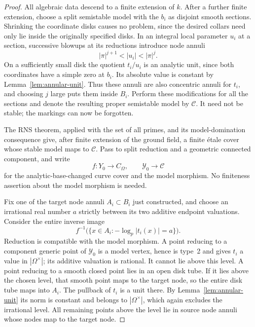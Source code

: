 \begin{proof}
All algebraic data descend to a finite extension of $k$.
After a further finite extension, choose a split semistable model
with the $b_i$ as disjoint smooth sections.  Shrinking the coordinate
disks causes no problem, since the desired collars need only lie inside
the originally specified disks.  In an integral local parameter $u_i$
at a section,
successive blowups at its reductions introduce node annuli
\[
 |\pi|^{j+1}<|u_i|<|\pi|^j .
\]
On a sufficiently small disk the quotient $t_i/u_i$ is an analytic
unit, since both coordinates have a simple zero at $b_i$.
Its absolute value is constant by Lemma~\ref{lem:annular-unit}.
Thus these annuli are also concentric annuli for $t_i$, and choosing
$j$ large puts them inside $B_i$.
Perform these modifications for all the sections and denote the
resulting proper semistable model by $\mathcal C$.
It need not be stable; the markings can now be forgotten.

The RNS theorem, applied with the set of all primes, and its
model-domination consequence
\cite[Theorem~A and Proposition~2.4(iv)]{MochizukiTsujimura}
give, after finite extension of the ground field, a finite \'etale
cover whose stable model maps to $\mathcal C$.
Pass to split reduction and a geometric connected component, and write
\[
 f:Y_0\longrightarrow C_\Omega,\qquad
 \mathcal Y_0\longrightarrow\mathcal C
\]
for the analytic-base-changed curve cover and the model morphism.
No finiteness assertion about the model morphism is needed.

Fix one of the target node annuli $A_i\subset B_i$ just constructed,
and choose an irrational real number $a$ strictly between its two
additive endpoint valuations.  Consider the entire inverse image
\[
 f^{-1}\bigl(\{x\in A_i:-\log_p|t_i(x)|=a\}\bigr).
\]  Reduction is compatible with the model
morphism.  A point reducing to a component generic point of
$\mathcal Y_0$ is a model vertex, hence is type~2 and gives $t_i$ a
value in $|\Omega^\times|$; its additive valuation is rational.
It cannot lie above this level.  A point reducing to a smooth closed
point lies in an open disk tube.  If it lies above the chosen level,
that smooth point maps to the target node, so the entire disk tube
maps into $A_i$.  The pullback of $t_i$ is a unit there.
By Lemma~\ref{lem:annular-unit} its norm is constant and belongs to
$|\Omega^\times|$, which again excludes the irrational level.
All remaining points above the level lie in source node annuli whose
nodes map to the target node.


\end{proof}
